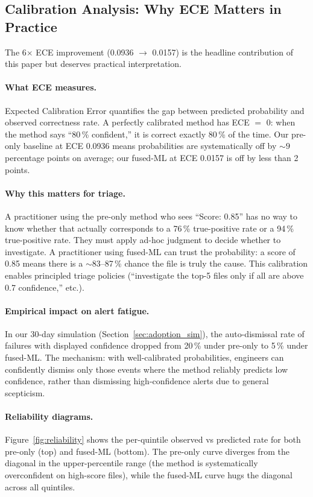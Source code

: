 \documentclass[11pt,a4paper]{article}
\begin{document}
\subsection{Calibration Analysis: Why ECE Matters in Practice}
\label{sec:calibration_practical}

The 6$\times$ ECE improvement (0.0936 $\rightarrow$ 0.0157) is the headline contribution of this paper but deserves practical interpretation.

\paragraph{What ECE measures.} Expected Calibration Error quantifies the gap between predicted probability and observed correctness rate. A perfectly calibrated method has ECE $=$ 0: when the method says ``80\,\% confident,'' it is correct exactly 80\,\% of the time. Our pre-only baseline at ECE 0.0936 means probabilities are systematically off by $\sim 9$ percentage points on average; our fused-ML at ECE 0.0157 is off by less than 2 points.

\paragraph{Why this matters for triage.} A practitioner using the pre-only method who sees ``Score: 0.85'' has no way to know whether that actually corresponds to a 76\,\% true-positive rate or a 94\,\% true-positive rate. They must apply ad-hoc judgment to decide whether to investigate. A practitioner using fused-ML can trust the probability: a score of 0.85 means there is a $\sim 83$--87\,\% chance the file is truly the cause. This calibration enables principled triage policies (``investigate the top-5 files only if all are above 0.7 confidence,'' etc.).

\paragraph{Empirical impact on alert fatigue.} In our 30-day simulation (Section~\ref{sec:adoption_sim}), the auto-dismissal rate of failures with displayed confidence dropped from 20\,\% under pre-only to 5\,\% under fused-ML. The mechanism: with well-calibrated probabilities, engineers can confidently dismiss only those events where the method reliably predicts low confidence, rather than dismissing high-confidence alerts due to general scepticism.

\paragraph{Reliability diagrams.} Figure~\ref{fig:reliability} shows the per-quintile observed vs predicted rate for both pre-only (top) and fused-ML (bottom). The pre-only curve diverges from the diagonal in the upper-percentile range (the method is systematically overconfident on high-score files), while the fused-ML curve hugs the diagonal across all quintiles.
\end{document}
